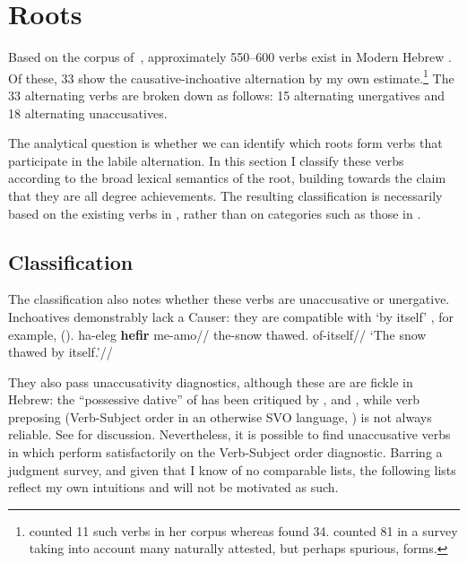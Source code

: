 \section{Roots} \label{sec:roots}
Based on the corpus of~\cite{ehrenfeld12}, approximately 550--600 verbs exist in Modern Hebrew {\thif}. Of these, 33 show the causative-inchoative alternation by my own estimate.\footnote{\cite{arad05} counted 11 such verbs in her corpus whereas \cite{laks11} found 34. \cite{lev16} counted 81 in a survey taking into account many naturally attested, but perhaps spurious, forms.} The 33 alternating verbs are broken down as follows: 15 alternating unergatives and 18 alternating unaccusatives. 

The analytical question is whether we can identify which roots form verbs that participate in the labile alternation. In this section I classify these verbs according to the broad lexical semantics of the root, building towards the claim that they are all degree achievements. The resulting classification is necessarily based on the existing verbs in {\thif}, rather than on categories such as those in \cite{levin93}.

	\subsection{Classification}
The classification also notes whether these verbs are unaccusative or unergative. Inchoatives demonstrably lack a Causer: they are compatible with `by itself' \citep{unaccusativity95,alexiadouanagnostopoulou04,koontzgarboden09,alexiadoudoron12,kastner17gjgl}, for example, (\nextx).
\ex
	\begingl
	\gla ha-eleg \textbf{hefir} me-a{\texttslig}mo//
	\glb the-snow thawed. of-itself//
	\glft `The snow thawed by itself.'//
	\endgl
\xe

They also pass unaccusativity diagnostics, although these are are fickle in Hebrew: the ``possessive dative'' of \cite{borergrodzinsky86} has been critiqued by \cite{gafter14li}, \cite{linzen14pd} and \cite{barashersiegalboneh15,barashersiegalboneh16}, while verb preposing (Verb-Subject order in an otherwise SVO language, \citealt{shlonsky87}) is not always reliable. See \cite{kastner17gjgl} for discussion. Nevertheless, it is possible to find unaccusative verbs in {\thif} which perform satisfactorily on the Verb-Subject order diagnostic. Barring a judgment survey, and given that I know of no comparable lists, the following lists reflect my own intuitions and will not be motivated as such.

